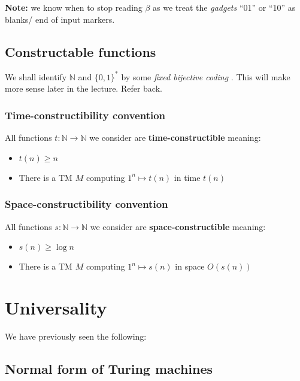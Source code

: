 \documentclass{article}
\newcommand{\N}{\mathbb{N}}
\begin{document}
\textbf{Note:} we know when to stop reading \(\beta\) as we treat the \textit{gadgets} ``01'' or ``10'' as blanks/ end of input markers.

\subsection{Constructable functions}

We shall identify $\N$ and $\{ 0,1 \} ^{*}$ by some \textit{fixed bijective coding} . This will make more sense later in the lecture. Refer back.

\subsubsection{Time-constructibility convention}

All functions $t: \N \rightarrow \N $ we consider are \textbf{time-constructible} meaning:
\begin{itemize}
  \item $t(n) \geq n$
  \item There is a TM $M$ computing $1^{n} \mapsto t(n)$ in time $t(n)$
\end{itemize}

\subsubsection{Space-constructibility convention}

All functions $s : \N \rightarrow \N$ we consider are \textbf{space-constructible} meaning:
\begin{itemize}
  \item $s(n) \geq\log n$
        \item There is a TM $M$ computing $1^{n} \mapsto s(n)$ in space $O(s(n))$
\end{itemize}

\section{Universality}
\label{sec:universality}

We have previously seen the following:

\subsection{Normal form of Turing machines}
\label{subsec:TMNF}
\end{document}
